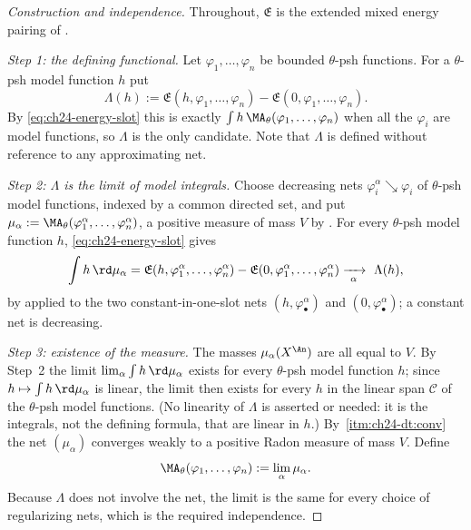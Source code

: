 \begin{proof}[Construction and independence]
Throughout, $\mathfrak E$ is the extended mixed energy pairing of
.

\emph{Step 1: the defining functional.}  Let $\varphi_1,\ldots,\varphi_n$
be bounded $\theta$-psh functions.  For a $\theta$-psh model function
$h$ put
\begin{equation}
\label{eq:ch24-lambda}
 \Lambda(h):=\mathfrak E(h,\varphi_1,\ldots,\varphi_n)
             -\mathfrak E(0,\varphi_1,\ldots,\varphi_n).
\end{equation}
By \eqref{eq:ch24-energy-slot} this is exactly
$\int h\,\MA_\theta(\varphi_1,\ldots,\varphi_n)$ when all the
$\varphi_i$ are model functions, so $\Lambda$ is the only candidate.
Note that $\Lambda$ is defined without reference to any approximating net.

\emph{Step 2: $\Lambda$ is the limit of model integrals.}  Choose
decreasing nets $\varphi_i^\alpha\searrow\varphi_i$ of $\theta$-psh
model functions, indexed by a common directed set, and put
$\mu_\alpha:=\MA_\theta(\varphi_1^\alpha,\ldots,\varphi_n^\alpha)$, a
positive measure of mass $V$ by .  For every
$\theta$-psh model function $h$, \eqref{eq:ch24-energy-slot} gives
\[
 \int h\,\rd\mu_\alpha
 =\mathfrak E(h,\varphi^\alpha_1,\ldots,\varphi^\alpha_n)
  -\mathfrak E(0,\varphi^\alpha_1,\ldots,\varphi^\alpha_n)
 \xrightarrow[\ \alpha\ ]{}\ \Lambda(h),
\]
by  applied to the two constant-in-one-slot
nets $(h,\varphi^\alpha_\bullet)$ and $(0,\varphi^\alpha_\bullet)$; a
constant net is decreasing.

\emph{Step 3: existence of the measure.}  The masses $\mu_\alpha(X^{\An})$
are all equal to $V$.  By Step~2 the limit
$\lim_\alpha\int h\,\rd\mu_\alpha$ exists for every $\theta$-psh model
function $h$; since $h\mapsto\int h\,\rd\mu_\alpha$ is linear, the limit
then exists for every $h$ in the linear span $\mathcal C$ of the
$\theta$-psh model functions.  (No linearity of $\Lambda$ is asserted or
needed: it is the integrals, not the defining formula, that are linear in
$h$.)  By
\,\cref{itm:ch24-dt:conv} the net
$(\mu_\alpha)$ converges weakly to a positive Radon measure of mass
$V$.  Define
\[
 \MA_\theta(\varphi_1,\ldots,\varphi_n):=\lim_\alpha\mu_\alpha .
\]
Because $\Lambda$ does not involve the net, the limit is the same for
every choice of regularizing nets, which is the required independence.


\end{proof}
